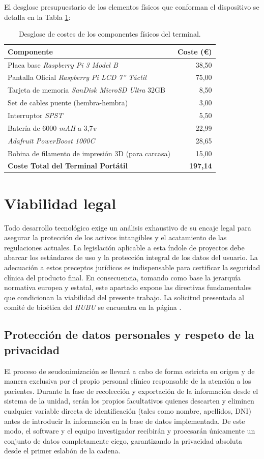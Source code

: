 El desglose presupuestario de los elementos físicos que conforman el dispositivo se detalla en la Tabla \ref{tab:costes_hardware}:

\begin{table}[hbt!]
\centering
\begin{tabular}{lr}
\hline
\textbf{Componente} & \textbf{Coste (€)} \\ \hline
Placa base \textit{Raspberry Pi 3 Model B} & 38,50 \\
Pantalla Oficial \textit{Raspberry Pi LCD 7'' Táctil} & 75,00 \\
Tarjeta de memoria \textit{SanDisk MicroSD Ultra} 32GB & 8,50 \\
Set de cables puente (hembra-hembra) & 3,00 \\
Interruptor \textit{SPST} & 5,50 \\
Batería de 6000 \textit{mAH} a 3,7\textit{v} & 22,99 \\
\textit{Adafruit PowerBoost 1000C} & 28,65 \\
Bobina de filamento de impresión 3D (para carcasa) & 15,00 \\ \hline
\textbf{Coste Total del Terminal Portátil} & \textbf{197,14} \\ \hline
\end{tabular}
\caption{Desglose de costes de los componentes físicos del terminal.}
\label{tab:costes_hardware}
\end{table}

\section{Viabilidad legal}
Todo desarrollo tecnológico exige un análisis exhaustivo de su encaje legal para asegurar la protección de los activos intangibles y el acatamiento de las regulaciones actuales. La legislación aplicable a esta índole de proyectos debe abarcar los estándares de uso y la protección integral de los datos del usuario. La adecuación a estos preceptos jurídicos es indispensable para certificar la seguridad clínica del producto final. En consecuencia, tomando como base la jerarquía normativa europea y estatal, este apartado expone las directivas fundamentales que condicionan la viabilidad del presente trabajo. La solicitud presentada al comité de bioética del \textit{HUBU} se encuentra en la página \pageref{anexos:mi_pdf}.
\subsection{Protección de datos personales y respeto de la privacidad}
El proceso de seudonimización se llevará a cabo de forma estricta en origen y de manera exclusiva por el propio personal clínico responsable de la atención a los pacientes. Durante la fase de recolección y exportación de la información desde el sistema de la unidad, serán los propios facultativos quienes descarten y eliminen cualquier variable directa de identificación (tales como nombre, apellidos, DNI) antes de introducir la información en la base de datos implementada. De este modo, el software y el equipo investigador recibirán y procesarán únicamente un conjunto de datos completamente ciego, garantizando la privacidad absoluta desde el primer eslabón de la cadena. 

